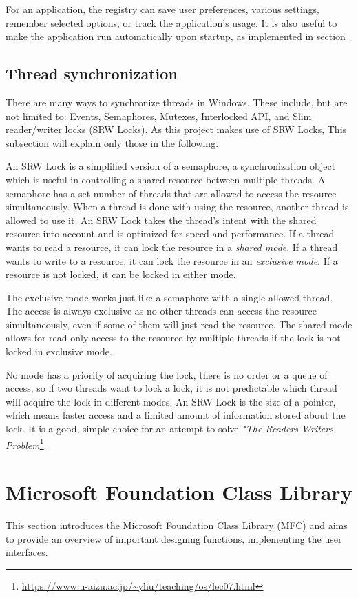 For an application, the registry can save user preferences, various settings, remember selected options, or track the application's usage. It is also useful to make the application run automatically upon startup, as implemented in section .

\subsection*{Thread synchronization}
There are many ways to synchronize threads in Windows. These include, but are not limited to: Events, Semaphores, Mutexes, Interlocked API, and Slim reader/writer locks (SRW Locks). As this project makes use of SRW Locks, This subsection will explain only those in the following.\cite{WinSyncFuncs}

An SRW Lock is a simplified version of a semaphore, a synchronization object which is useful in controlling a shared resource between multiple threads. A semaphore has a set number of threads that are allowed to access the resource simultaneously. When a thread is done with using the resource, another thread is allowed to use it.\cite{WinSemaphores} An SRW Lock takes the thread's intent with the shared resource into account and is optimized for speed and performance. If a thread wants to read a resource, it can lock the resource in a \textit{shared mode}. If a thread wants to write to a resource, it can lock the resource in an \textit{exclusive mode}. If a resource is not locked, it can be locked in either mode. 

The exclusive mode works just like a semaphore with a single allowed thread. The access is always exclusive as no other threads can access the resource simultaneously, even if some of them will just read the resource.
The shared mode allows for read-only access to the resource by multiple threads if the lock is not locked in exclusive mode.

No mode has a priority of acquiring the lock, there is no order or a queue of access, so if two threads want to lock a lock, it is not predictable which thread will acquire the lock in different modes. An SRW Lock is the size of a pointer, which means faster access and a limited amount of information stored about the lock. It is a good, simple choice for an attempt to solve \textit{"The Readers-Writers Problem}\footnote{\url{https://www.u-aizu.ac.jp/~yliu/teaching/os/lec07.html}}.
\cite{WinSRW}

\section{Microsoft Foundation Class Library}
This section introduces the Microsoft Foundation Class Library (MFC) and aims to provide an overview of important designing functions, implementing the user interfaces.

